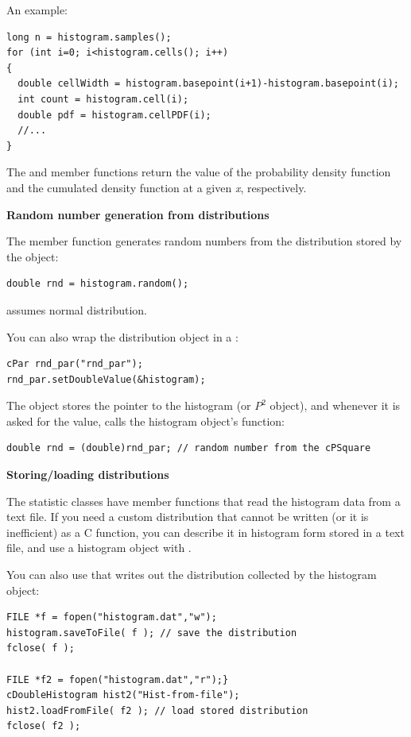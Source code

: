 An example:

\begin{verbatim}
long n = histogram.samples();
for (int i=0; i<histogram.cells(); i++)
{
  double cellWidth = histogram.basepoint(i+1)-histogram.basepoint(i);
  int count = histogram.cell(i);
  double pdf = histogram.cellPDF(i);
  //...
}
\end{verbatim}


The  and  member functions
return the value of the probability density function and the cumulated
density function at a given \textit{x}, respectively.


\textbf{Random number generation from distributions}


The  member function generates random
numbers from the distribution stored by the
object:

\begin{verbatim}
double rnd = histogram.random();
\end{verbatim}


 assumes normal distribution.

You can also wrap the distribution object in a :

\begin{verbatim}
cPar rnd_par("rnd_par");
rnd_par.setDoubleValue(&histogram);
\end{verbatim}


The  object stores the pointer to the histogram (or $P^{2}$ object),
and whenever it is asked for the value, calls the histogram object's 
function:

\begin{verbatim}
double rnd = (double)rnd_par; // random number from the cPSquare
\end{verbatim}

\textbf{Storing/loading distributions}


The statistic classes have  member functions
that read the histogram data from a text file. If you need a custom
distribution that cannot be written (or it
is inefficient) as a C function, you can describe it in histogram form
stored in a text file, and use a histogram object with
.

You can also use that writes out the distribution
collected by the histogram object:

\begin{verbatim}
FILE *f = fopen("histogram.dat","w");
histogram.saveToFile( f ); // save the distribution
fclose( f );

FILE *f2 = fopen("histogram.dat","r");}
cDoubleHistogram hist2("Hist-from-file");
hist2.loadFromFile( f2 ); // load stored distribution
fclose( f2 );
\end{verbatim}


